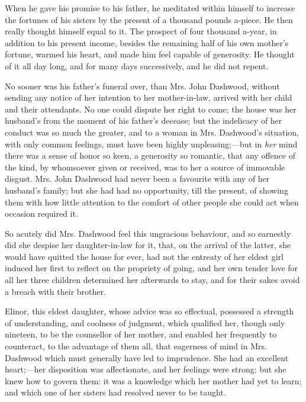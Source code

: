 When he gave his promise to his father, he meditated within himself to increase the fortunes of his sisters by the present of a thousand pounds a-piece. He then really thought himself equal to it. The prospect of four thousand a-year, in addition to his present income, besides the remaining half of his own mother's fortune, warmed his heart, and made him feel capable of generosity.  He thought of it all day long, and for many days successively, and he did not repent.

No sooner was his father's funeral over, than Mrs. John Dashwood, without sending any notice of her intention to her mother-in-law, arrived with her child and their attendants. No one could dispute her right to come; the house was her husband's from the moment of his father's decease; but the indelicacy of her conduct was so much the greater, and to a woman in Mrs. Dashwood's situation, with only common feelings, must have been highly unpleasing;---but in {\em her} mind there was a sense of honor so keen, a generosity so romantic, that any offence of the kind, by whomsoever given or received, was to her a source of immovable disgust. Mrs. John Dashwood had never been a favourite with any of her husband's family; but she had had no opportunity, till the present, of showing them with how little attention to the comfort of other people she could act when occasion required it.

So acutely did Mrs. Dashwood feel this ungracious behaviour, and so earnestly did she despise her daughter-in-law for it, that, on the arrival of the latter, she would have quitted the house for ever, had not the entreaty of her eldest girl induced her first to reflect on the propriety of going, and her own tender love for all her three children determined her afterwards to stay, and for their sakes avoid a breach with their brother.

Elinor, this eldest daughter, whose advice was so effectual, possessed a strength of understanding, and coolness of judgment, which qualified her, though only nineteen, to be the counsellor of her mother, and enabled her frequently to counteract, to the advantage of them all, that eagerness of mind in Mrs. Dashwood which must generally have led to imprudence. She had an excellent heart;---her disposition was affectionate, and her feelings were strong; but she knew how to govern them: it was a knowledge which her mother had yet to learn; and which one of her sisters had resolved never to be taught.


